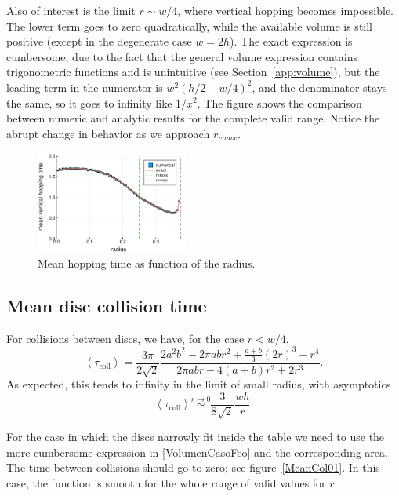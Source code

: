 \documentclass[superscriptaddress,pre,reprint,showpacs,twocolumn]{revtex4-1}
\newcommand{\mean}[1]{\left \langle #1 \right \rangle}
\begin{document}
Also of interest is the limit $r\sim w/4$, where vertical hopping becomes
impossible.  The lower term goes to zero quadratically, while the available volume
is still positive (except in the degenerate case $w=2h$). The exact expression
is cumbersome, due to the fact that the general volume expression contains trigonometric functions
 and is unintuitive (see Section~\ref{app:volume}),
but the leading term in the numerator is  $w^2(h/2-w/4)^2$, and the denominator
stays the same, so
it goes to infinity
like $1/x^2$. The figure \label{MeanHopp01} shows the comparison between
numeric and analytic results for the complete valid range. Notice the abrupt
change in behavior as we approach $r_{vmax}$.


\begin{figure}[h]
  \centering
  \includegraphics[width=0.45\textwidth]{./figures/VertHop01.pdf}
  \caption{Mean hopping time as function of the radius.}\label{MeanHopp01}
\end{figure}


\subsection{Mean disc collision time}

For collisions between discs, we have, for the case $r < w/4$,
\begin{equation}\label{colltau}
 \mean{\tau_\text{coll}} = 	
\frac{3 \pi}{2\sqrt{2}}
\frac {2 a^{2} b^{2}  - 2 \pi a b r^{2} + \textstyle \frac{a+b}{3}  (2r)^{3}  -  r^4}
{2\pi a b r -4(a+b)r^2+2r^3}.
\end{equation}
As expected, this tends to infinity in the limit of small radius, with asymptotics
\begin{equation}\label{colltaulim0}
\mean{\tau_\text{coll}} \overset{r \to 0}{\sim}
\frac{3}{8\sqrt{2}}\frac{wh}{r}.
\end{equation}

For the case in which the discs narrowly fit inside the table we need to
use the more cumbersome expression in \eqref{VolumenCasoFeo} and
the corresponding area. The time between collisions should go to zero; 
see figure~\ref{MeanCol01}. In this case, the function is smooth for the whole
range of valid values for $r$.
\end{document}
